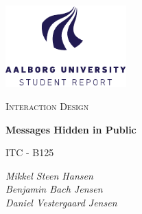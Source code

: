 \begin{titlepage}
    \centering
	\includegraphics[width=0.35\textwidth]{Projectdoc/Assets/Illustrationer/aau_logo_en.pdf}\par\vspace{1cm}
	{\scshape\Large Interaction Design\par}
	\vspace{0.2cm}
	{\huge\bfseries Messages Hidden in Public\par}
	\vspace{0.2cm}
	{\scshape\Large ITC - B125\par}
	\vspace{2cm}
	{\Large\itshape 
    	Mikkel Steen Hansen\\
        Benjamin Bach Jensen\\
        Daniel Vestergaard Jensen\\
    \par}
	\vfill
	\vfill
\end{titlepage}